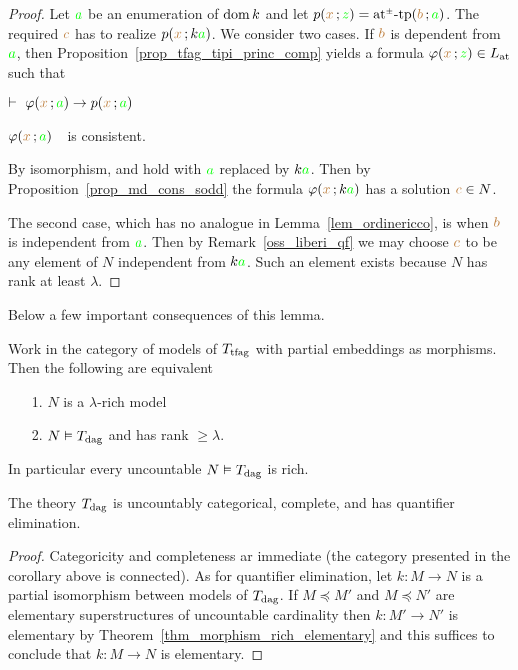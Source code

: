 \begin{proof}
Let ${\gr a}$ be an enumeration of $\dom k$ and let $p({\mr x}\,;{\gr z})=\atpmtp({\mr b}\,;{\gr a})$.
%
 The required ${\mr c}$ has to realize $p({\mr x}\,;k{\gr a})$.
%
We consider two cases.
%
If ${\mr b}$ is dependent from ${\gr a}$, then Proposition~\ref{prop_tfag_tipi_princ_comp} yields a formula $\phi({\mr x}\,;{\gr z})\in L_{\rm at}$ such that 

\noindent{}\hspace{5ex} $\proves\ \phi({\mr x}\,;{\gr a})\imp p({\mr x}\,;{\gr a})$

\noindent{}\hspace{5ex} $\phi({\mr x}\,;{\gr a})$\ \ is consistent.

By isomorphism,   and  hold with ${\gr a}$ replaced by $k{\gr a}$.
%
Then by Proposition~\ref{prop_md_cons_sodd} the formula $\phi({\mr x}\,;k{\gr a})$ has a solution ${\mr c} \in N$.

The second case, which has no analogue in Lemma~\ref{lem_ordinericco}, is when ${\mr b}$ is independent from ${\gr a}$.
%
Then by   Remark~\ref{oss_liberi_qf} we may choose ${\mr c}$ to be any element of $N$ independent from $k{\gr a}$.
%
Such an element exists because $N$ has rank at least $\lambda$.
\end{proof}

Below a few important consequences of this lemma.

\begin{corollary}\label{corol_acfUltraOmog}
Work in the category of models of $T_{\rm tfag}$ with partial embeddings as morphisms. Then the following are equivalent
%
\begin{itemize}
\item[1.] $N$ is a $\lambda$-rich model
\item[2.] $N\models T_{\rm dag}$ and has rank $\ge\lambda$.
\end{itemize}
In particular every uncountable $N\models T_{\rm dag}$ is rich.
\end{corollary}

\begin{corollary}\label{corol_ModDivUltraOmog}
The theory $T_{\rm dag}$ is uncountably categorical, complete, and has quantifier elimination.
\end{corollary}

\begin{proof}
Categoricity and completeness ar immediate (the category presented in the corollary above is connected).
%
As for quantifier elimination, let $k:M\to N$ is a partial isomorphism between models of $T_{\rm dag}$.
%
If $M\preceq M'$ and $M\preceq N'$ are elementary superstructures of uncountable cardinality then $k:M'\to N'$ is elementary by Theorem~\ref{thm_morphism_rich_elementary} and this suffices to conclude that  $k:M\to N$ is elementary.
\end{proof}


